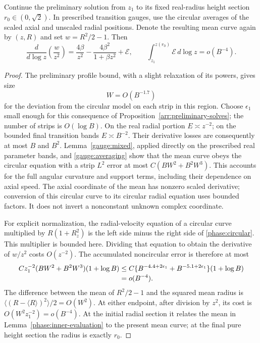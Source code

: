 \begin{lemma}\label{phase:primitive}
Continue the preliminary solution from $z_1$ to its fixed real-radius
height section $r_0\in(0,\sqrt2)$.  In prescribed transition gauges,
use the circular averages of the scaled axial and unscaled radial
positions.  Denote the resulting mean curve again by $(z,R)$ and set
$w=R^2/2-1$.  Then
\begin{equation}
 \frac{d}{d\log z}\left(\frac w{z^2}\right)
       =\frac{4\beta}{z^2}-\frac{4\beta^2}{1+\beta z^2}
           +\mathcal E,
 \qquad \int_{z_1}^{z(r_0)}\mathcal E\,d\log z=o(B^{-4}).
 \label{phase:integrated-equation}
\end{equation}
\end{lemma}
\begin{proof}
The preliminary profile bound, with a slight relaxation of its powers,
gives size
\begin{equation}
 W=O(B^{-1.7})
 \label{phase:W}
\end{equation}
for the deviation from the circular model on each strip in this region.
Choose $\epsilon_1$ small enough for this consequence of
Proposition~\ref{arr:preliminary-solves}; the number of strips is
$O(\log B)$.  On the real radial portion $E\asymp z^{-2}$; on the
bounded final transition bands $E\asymp B^{-2}$.
Their derivative losses are consequently at most $B$ and $B^2$.
Lemma~\ref{gauge:mixed}, applied directly on the prescribed real parameter
bands, and \eqref{gauge:averaging} show that the mean curve obeys the
circular equation with a strip $L^2$ error at most
$C(BW^2+B^2W^3)$.  This accounts for the full angular curvature and
support terms, including their dependence on axial speed.
The axial coordinate of the mean has nonzero scaled derivative; conversion
of this circular curve to its circular radial equation uses bounded
factors.  It does not invert a nonconstant unknown complex coordinate.

For explicit normalization, the radial-velocity equation of a circular
curve multiplied by $R(1+R_z^2)$ is the left side minus the right side
of \eqref{phase:circular}.  This multiplier is bounded here.  Dividing
that equation to obtain the derivative of $w/z^2$ costs $O(z^{-2})$.
The accumulated noncircular error is therefore at most
\begin{align}
 C z_1^{-2}(BW^2+B^2W^3)(1+\log B)
 &\le C\{B^{-4.4+2\epsilon_1}+B^{-5.1+2\epsilon_1}\}(1+\log B)
 \notag\\[-2pt]&=o(B^{-4}).
 \label{phase:tensor-budget}
\end{align}
The difference between the mean of $R^2/2-1$ and the squared mean radius
is $\langle(R-\langle R\rangle)^2\rangle/2=O(W^2)$.
At either endpoint, after division by $z^2$, its cost is
$O(W^2 z_1^{-2})=o(B^{-4})$.  At the initial radial section it relates
the mean in Lemma~\ref{phase:inner-evaluation} to the present mean curve;
at the final pure height section the radius is exactly $r_0$.


\end{proof}
